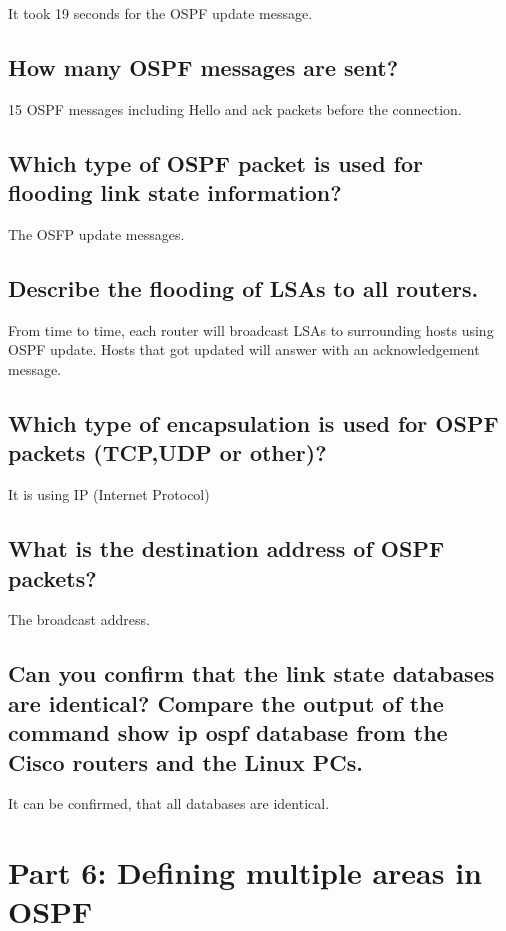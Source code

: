 \documentclass[a4paper, 11pt]{article}
\begin{document}
It took 19 seconds for the OSPF update message.

\subsection{How many OSPF messages are sent? }

15 OSPF messages including Hello and ack packets before the connection.

\subsection{Which type of OSPF packet is used for flooding link state information? }

The OSFP update messages.

\subsection{Describe the flooding of LSAs to all routers. }

From time to time, each router will broadcast LSAs to surrounding hosts using OSPF update. Hosts that got updated will answer with an acknowledgement message.

\subsection{Which type of encapsulation is used for OSPF packets (TCP,UDP or other)? }

It is using IP (Internet Protocol)

\subsection{What is the destination address of OSPF packets? }

The broadcast address.

\subsection{Can you confirm that the link state databases are identical? Compare the output of the command show ip ospf database from the Cisco routers and the Linux PCs. }

It can be confirmed, that all databases are identical.

\section{Part 6: Defining multiple areas in OSPF}
\end{document}
